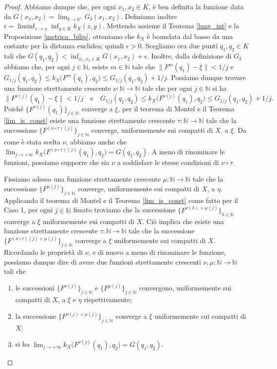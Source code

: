 \begin{proof}
    Abbiamo dunque che, per ogni $x_1,x_2 \in K$, è ben definita la funzione data da $\displaystyle G(x_1,x_2)=\lim_{\delta\longrightarrow 0^+}G_\delta(x_1,x_2)$. Definiamo inoltre $\displaystyle \epsilon=\liminf_{z \longrightarrow\eta}\inf_{y\in K}k_X(z,y)$. Mettendo assieme il Teorema \ref{lung_int} e la Proposizione \ref{metrica_bilip}, otteniamo che $k_X$ è boundata dal basso da una costante per la distanza euclidea; quindi $\epsilon>0$. Scegliamo ora due punti $q_1,q_2 \in K$ tali che $\displaystyle G(q_1,q_2)<\inf_{x_1,x_2\in K}G(x_1,x_2)+\epsilon$. Inoltre, dalla definizione di $G_{\delta}$ abbiamo che, per ogni $j\in\mathbb{N}$, esiste $m\in\mathbb{N}$ tale che $\|F^m(q_1)-\xi\|<1/j$ e $G_{1/j}(q_1,q_2) \le k_X\big(F^m(q_1),q_2\big) \le G_{1/j}(q_1,q_2)+1/j$. Possiamo dunque trovare una funzione strettamente crescente $\nu:\mathbb{N}\longrightarrow\mathbb{N}$ tale che per ogni $j\in\mathbb{N}$ si ha
    $$\|F^{\nu(j)}(q_1)-\xi\|<1/j \quad\text{e}\quad G_{1/j}(q_1,q_2) \le k_X\big(F^{\nu(j)}(q_1),q_2\big) \le G_{1/j}(q_1,q_2)+1/j.$$
    Poiché $\{F^{\nu(j)}(q_1)\}_{j\in\mathbb{N}}$ converge a $\xi$, per il teorema di Montel e il Teorema \ref{lim_is_const} esiste una funzione strettamente crescente $\tau:\mathbb{N}\longrightarrow\mathbb{N}$ tale che la successione $\{F^{(\nu\circ\tau)(j)}\}_{j\in\mathbb{N}}$ converge, uniformemente sui compatti di $X$, a $\xi$. Da come è stata scelta $\nu$, abbiamo anche che $\displaystyle\lim_{j\longrightarrow+\infty}k_X\big(F^{(\nu\circ\tau)(j)}(q_1),q_2\big)=G(q_1,q_2)$. A meno di rinominare le funzioni, possiamo supporre che sia $\nu$ a soddisfare le stesse condizioni di $\nu\circ\tau$.

    Fissiamo adesso una funzione strettamente crescente $\mu:\mathbb{N}\longrightarrow\mathbb{N}$ tale che la successione $\{F^{\mu(j)}\}_{j\in\mathbb{N}}$ converge, uniformemente sui compatti di $X$, a $\eta$. Applicando il teorema di Montel e il Teorema \ref{lim_is_const} come fatto per il Caso 1, per ogni $j\in\mathbb{N}$ fissato troviamo che la successione $\{F^{\nu(h)+\mu(j)}\}_{h\in\mathbb{N}}$ converge a $\xi$ uniformemente sui compatti di $X$. Ciò implica che esiste una funzione strettamente crescente $\tau:\mathbb{N}\longrightarrow\mathbb{N}$ tale che la successione $\{F^{(\nu\circ\tau)(j)+\mu(j)}\}_{j\in\mathbb{N}}$ converge a $\xi$ uniformemente sui compatti di $X$. Ricordando le proprietà di $\nu$, e di nuovo a meno di rinominare le funzione, possiamo dunque dire di avere due funzioni strettamente crescenti $\nu,\mu:\mathbb{N}\longrightarrow\mathbb{N}$ tali che
    \begin{enumerate}[label={(\arabic*)}]
        \item le successioni $\{F^{\nu(j)}\}_{j\in\mathbb{N}}$ e $\{F^{\mu(j)}\}_{j\in\mathbb{N}}$ convergono, uniformemente sui compatti di $X$, a $\xi$ e $\eta$ rispettivamente;
        \item la successione $\{F^{\nu(j)+\mu(j)}\}_{j\in\mathbb{N}}$ converge a $\xi$ uniformemente sui compatti di $X$;
        \item si ha $\displaystyle\lim_{j\longrightarrow+\infty}k_X\big(F^{\nu(j)}(q_1),q_2\big)=G(q_1,q_2)$.
    \end{enumerate}


\end{proof}
